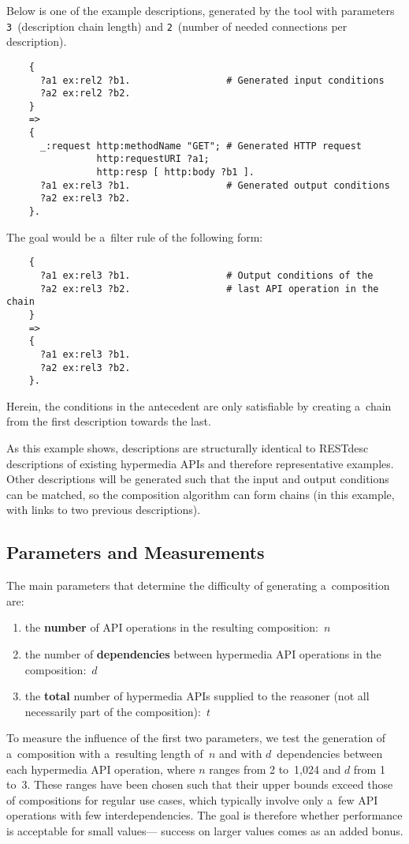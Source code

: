 Below is one of the example descriptions,
generated by the tool with parameters \verb!3!~(description chain length)
and \verb!2!~(number of needed connections per description).
\begin{Verbatim}
    {
      ?a1 ex:rel2 ?b1.                 # Generated input conditions
      ?a2 ex:rel2 ?b2.
    }
    =>
    {
      _:request http:methodName "GET"; # Generated HTTP request
                http:requestURI ?a1;
                http:resp [ http:body ?b1 ].
      ?a1 ex:rel3 ?b1.                 # Generated output conditions
      ?a2 ex:rel3 ?b2.
    }.
\end{Verbatim}

The goal would be a~filter rule of the following form:
\begin{Verbatim}
    {
      ?a1 ex:rel3 ?b1.                 # Output conditions of the
      ?a2 ex:rel3 ?b2.                 # last API operation in the chain
    }
    =>
    {
      ?a1 ex:rel3 ?b1.
      ?a2 ex:rel3 ?b2.
    }.
\end{Verbatim}
Herein, the conditions in the antecedent
are only satisfiable by creating a~chain
from the first description towards the last.

As this example shows,
descriptions are structurally identical to RESTdesc descriptions of existing hypermedia APIs
and therefore representative examples.
Other descriptions will be generated
such that the input and output conditions can be matched,
so the composition algorithm can form chains
(in this example, with links to two previous descriptions).

\subsection{Parameters and Measurements}
The main parameters that determine the difficulty of generating a~composition are:
\begin{enumerate}
\item the \textbf{number} of API operations in the resulting composition:~$n$
\item the number of \textbf{dependencies} between hypermedia API operations in the composition:~$d$
\item the \textbf{total} number of hypermedia APIs supplied to the reasoner
      (not all necessarily part of the composition):~$t$
\end{enumerate}

To measure the influence of the first two parameters,
we test the generation of a~composition with a~resulting length of~$n$
and with $d$~dependencies between each hypermedia API operation,
where $n$ ranges from 2 to~1,024 and $d$ from 1 to~3.
These ranges have been chosen such that their upper bounds exceed
those of compositions for regular use cases,
which typically involve only a~few API operations
with few interdependencies.
The goal is therefore whether performance is acceptable for small values---%
success on larger values comes as an added bonus.


